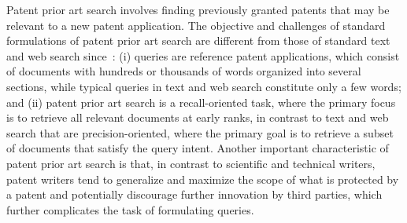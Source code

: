 \begin{comment}
Patents are used by legal entities to legally protect their
inventions and represent a multi-billion dollar industry of licensing
and litigation. In 2013, 302,948 patent applications were approved
in the US alone%
\footnote{http://www.uspto.gov/web/offices/ac/ido/oeip/taf/ us\_stat.htm%
}, a number that has doubled in the past 15 years. Given that a single
existing patent may invalidate a new patent application, helping inventors
assess the patentability of an idea through a patent prior art search
before writing a complete patent application is an important task.
\end{comment}

Patent prior art search involves finding previously granted patents
that may be relevant to a new patent application. The objective and
challenges of standard formulations of patent prior art search are
different from those of standard text and web search
since~\cite{magdy2012toward}: (i) queries are reference patent
applications, which consist of documents with hundreds or thousands of
words organized into several sections, while typical queries in text
and web search constitute only a few words; and (ii) patent prior art
search is a recall-oriented task, where the primary focus is to
retrieve all relevant documents at early ranks, in contrast to text
and web search that are precision-oriented, where the primary goal is
to retrieve a subset of documents that satisfy the query
intent. Another important characteristic of patent prior art search is
that, in contrast to scientific and technical writers, patent writers
tend to generalize and maximize the scope of what is protected by a
patent and potentially discourage further innovation by third parties,
which further complicates the task of formulating queries.

